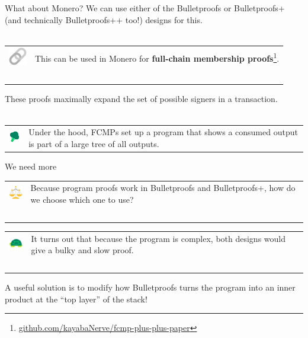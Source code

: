 \documentclass[aspectratio=169]{beamer}
\begin{document}
\begin{frame}{What about Monero?}
    We can use either of the Bulletproofs or Bulletproofs+ (and technically Bulletproofs++ too!) designs for this. \\~\\

    \begin{tabular}{>{\arraybackslash}m{40px} >{\arraybackslash}m{320px}}
        \includegraphics[width=30px]{images/chain.png} & This can be used in Monero for \textbf{full-chain membership proofs}\footnote{\url{github.com/kayabaNerve/fcmp-plus-plus-paper}}. \\~\\
    \end{tabular}

    These proofs maximally expand the set of possible signers in a transaction. \\~\\

    \begin{tabular}{>{\arraybackslash}m{40px} >{\arraybackslash}m{320px}}
        \includegraphics[width=30px]{images/tree.png} & Under the hood, FCMPs set up a program that shows a consumed output is part of a large tree of all outputs.
    \end{tabular}
\end{frame}


\begin{frame}{We need more}
    \begin{tabular}{>{\arraybackslash}m{40px} >{\arraybackslash}m{320px}}
        \includegraphics[width=30px]{images/scale.png} & Because program proofs work in Bulletproofs and Bulletproofs+, how do we choose which one to use? \\~\\
    \end{tabular}

    \begin{tabular}{>{\arraybackslash}m{40px} >{\arraybackslash}m{320px}}
        \includegraphics[width=30px]{images/turtle.png} & It turns out that because the program is complex, both designs would give a bulky and slow proof. \\~\\
    \end{tabular}

    A useful solution is to modify how Bulletproofs turns the program into an inner product at the ``top layer'' of the stack!
\end{frame}
\end{document}
